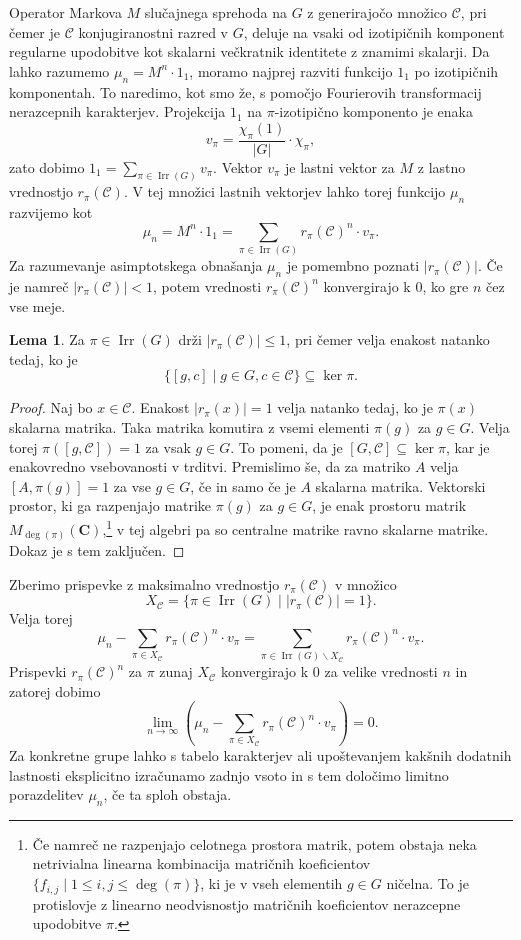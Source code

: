 \documentclass[11pt]{book}
\def\CC{\mathbf{C}}
\def\conclass{\mathcal{C}}
\DeclareMathOperator\Irr{Irr}
\theoremstyle{definition}
\theoremstyle{zgled}
\theoremstyle{zgledbrezstevilke}
\theoremstyle{odprtproblem}
\theoremstyle{domacanaloga}
\newenvironment{dokaz}
    {\color{siva}\begin{proof}}
    {\end{proof}}
\theoremstyle{izrek}
\newtheorem{lema}[theorem]{Lema}
\begin{document}
Operator Markova $M$ slučajnega sprehoda na $G$ z generirajočo množico $\conclass$, pri čemer je $\conclass$ konjugiranostni razred v $G$, deluje na vsaki od izotipičnih komponent regularne upodobitve kot skalarni večkratnik identitete z znamimi skalarji. Da lahko razumemo $\mu_n = M^n \cdot 1_1$, moramo najprej razviti funkcijo $1_1$ po izotipičnih komponentah. To naredimo, kot smo že, s pomočjo Fourierovih transformacij nerazcepnih karakterjev. Projekcija $1_1$ na $\pi$-izotipično komponento je enaka
\[
    v_{\pi} = \frac{\chi_{\pi}(1)}{|G|} \cdot \chi_{\pi},
\] 
zato dobimo $1_1 = \sum_{\pi \in \Irr(G)} v_{\pi}$. Vektor $v_{\pi}$ je lastni vektor za $M$ z lastno vrednostjo $r_{\pi}(\conclass)$. V tej množici lastnih vektorjev lahko torej funkcijo $\mu_n$ razvijemo kot
\[
    \mu_n = M^n \cdot 1_1 = \sum_{\pi \in \Irr(G)} r_{\pi}(\conclass)^n \cdot v_{\pi}.
\]
Za razumevanje asimptotskega obnašanja $\mu_n$ je pomembno poznati $|r_{\pi}(\conclass)|$. Če je namreč $|r_{\pi}(\conclass)| < 1$, potem vrednosti $r_{\pi}(\conclass)^n$ konvergirajo k $0$, ko gre $n$ čez vse meje.

\begin{lema}
Za $\pi \in \Irr(G)$ drži $|r_{\pi}(\conclass)| \leq 1$, pri čemer velja enakost natanko tedaj, ko je 
\[
    \{ [g,c] \mid g \in G, c \in \conclass \} \subseteq \ker \pi.
\]
\end{lema}
\begin{dokaz}
Naj bo $x \in \conclass$. Enakost $|r_{\pi}(x)| = 1$ velja natanko tedaj, ko je $\pi(x)$ skalarna matrika. Taka matrika komutira z vsemi elementi $\pi(g)$ za $g \in G$. Velja torej $\pi([g, \conclass]) = 1$ za vsak $g \in G$. To pomeni, da je $[G, \conclass] \subseteq \ker \pi$, kar je enakovredno vsebovanosti v trditvi. Premislimo še, da za matriko $A$ velja $[A, \pi(g)] = 1$ za vse $g \in G$, če in samo če je $A$ skalarna matrika. Vektorski prostor, ki ga razpenjajo matrike $\pi(g)$ za $g \in G$, je enak prostoru matrik $M_{\deg(\pi)}(\CC)$,\footnote{Če namreč ne razpenjajo celotnega prostora matrik, potem obstaja neka netrivialna linearna kombinacija matričnih koeficientov $\{ f_{i,j} \mid 1 \leq i, j \leq \deg(\pi) \}$, ki je v vseh elementih $g \in G$ ničelna. To je protislovje z linearno neodvisnostjo matričnih koeficientov nerazcepne upodobitve $\pi$.} v tej algebri pa so centralne matrike ravno skalarne matrike. Dokaz je s tem zaključen.
\end{dokaz}

Zberimo prispevke z maksimalno vrednostjo $r_{\pi}(\conclass)$ v množico
\[
    X_{\conclass} = \{ \pi \in \Irr(G) \mid |r_{\pi}(\conclass)| = 1 \}.
\]
Velja torej
\[
    \mu_n - \sum_{\pi \in X_{\conclass}} r_{\pi}(\conclass)^n \cdot v_{\pi}
    = \sum_{\pi \in \Irr(G) \backslash X_{\conclass}} r_{\pi}(\conclass)^n \cdot v_{\pi}.
\]
Prispevki $r_{\pi}(\conclass)^n$ za $\pi$ zunaj $X_{\conclass}$ konvergirajo k $0$ za velike vrednosti $n$ in zatorej dobimo
\[
    \lim_{n \to \infty} \left( \mu_n - \sum_{\pi \in X_{\conclass}} r_{\pi}(\conclass)^n \cdot v_{\pi} \right) = 0.
\]
Za konkretne grupe lahko s tabelo karakterjev ali upoštevanjem kakšnih dodatnih lastnosti eksplicitno izračunamo zadnjo vsoto in s tem določimo limitno porazdelitev $\mu_n$, če ta sploh obstaja.
\end{document}

